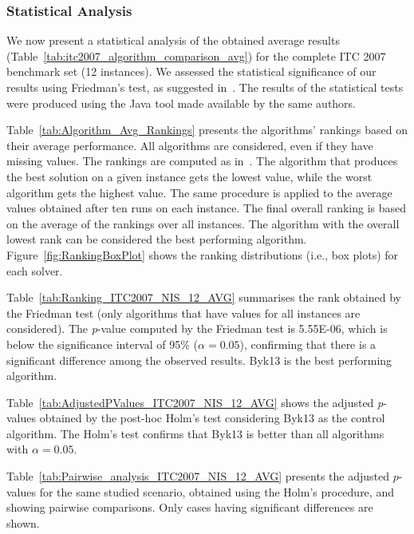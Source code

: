 %
%
\subsubsection{Statistical Analysis}

We now present a statistical analysis of the obtained average results (Table~\ref{tab:itc2007_algorithm_comparison_avg}) for the complete ITC 2007 benchmark set (12 instances). We assessed the statistical significance of our results using Friedman's test, as suggested in~\cite{Garcia2008}. The results of the statistical tests were produced using the Java tool made available by the same authors. 

Table~\ref{tab:Algorithm_Avg_Rankings} presents the algorithms' rankings based on their average performance. All algorithms are considered, even if they have missing values. The rankings are computed as in~\cite{Demeester2012}. The algorithm that produces the best solution on a given instance gets the lowest value, while the worst algorithm gets the highest value. The same procedure is applied to the average values obtained after ten runs on each instance. The final overall ranking is based on the average of the rankings over all instances. The algorithm with the overall lowest rank can be considered the best performing algorithm. Figure~\ref{fig:RankingBoxPlot} shows the ranking distributions (i.e., box plots) for each solver.

Table~\ref{tab:Ranking_ITC2007_NIS_12_AVG} summarises the rank obtained by the Friedman test (only algorithms that have values for all instances are considered). The \textit{p}-value computed by the Friedman test is \num{5.55E-06}, which is below the significance interval of 95\% ($\alpha = 0.05$), confirming that there is a significant difference among the observed results. Byk13 is the best performing algorithm.


Table~\ref{tab:AdjustedPValues_ITC2007_NIS_12_AVG} shows the adjusted \textit{p}-values obtained by the post-hoc Holm's test considering Byk13 as the control algorithm. The Holm's test confirms that Byk13 is better than all algorithms with $\alpha = 0.05$. 

Table~\ref{tab:Pairwise_analysis_ITC2007_NIS_12_AVG} presents the adjusted $p$-values for the same studied scenario, obtained using the Holm's procedure, and showing pairwise comparisons. Only cases having significant differences are shown. 


